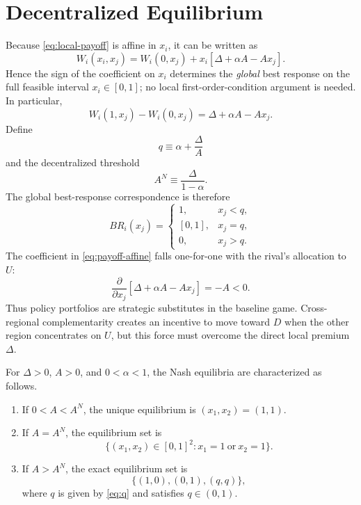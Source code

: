 \section{Decentralized Equilibrium}
\label{sec:equilibrium}

Because \eqref{eq:local-payoff} is affine in $x_i$, it can be written as
\begin{equation}
W_i(x_i,x_j)
=W_i(0,x_j)
+x_i\left[\Delta+\alpha A-Ax_j\right].
\label{eq:payoff-affine}
\end{equation}
Hence the sign of the coefficient on $x_i$ determines the \emph{global} best response on the full feasible interval $x_i\in[0,1]$; no local first-order-condition argument is needed. In particular,
\begin{equation}
W_i(1,x_j)-W_i(0,x_j)
=\Delta+\alpha A-Ax_j.
\label{eq:payoff-difference}
\end{equation}
Define
\begin{equation}
q\equiv \alpha+\frac{\Delta}{A}
\label{eq:q}
\end{equation}
and the decentralized threshold
\begin{equation}
A^N\equiv \frac{\Delta}{1-\alpha}.
\label{eq:AN}
\end{equation}
The global best-response correspondence is therefore
\begin{equation}
BR_i(x_j)=
\begin{cases}
1, & x_j<q,\\
[0,1], & x_j=q,\\
0, & x_j>q.
\end{cases}
\label{eq:best-response}
\end{equation}
The coefficient in \eqref{eq:payoff-affine} falls one-for-one with the rival's allocation to $U$:
\begin{equation}
\frac{\partial}{\partial x_j}
\left[\Delta+\alpha A-Ax_j\right]=-A<0.
\label{eq:strategic-substitutes}
\end{equation}
Thus policy portfolios are strategic substitutes in the baseline game. Cross-regional complementarity creates an incentive to move toward $D$ when the other region concentrates on $U$, but this force must overcome the direct local premium $\Delta$.

\begin{proposition}
\label{prop:nash-set}
For $\Delta>0$, $A>0$, and $0<\alpha<1$, the Nash equilibria are characterized as follows.
\begin{enumerate}
\item If $0<A<A^N$, the unique equilibrium is $(x_1,x_2)=(1,1)$.
\item If $A=A^N$, the equilibrium set is
\[
\{(x_1,x_2)\in[0,1]^2:x_1=1\ \text{or}\ x_2=1\}.
\]
\item If $A>A^N$, the exact equilibrium set is
\[
\{(1,0),(0,1),(q,q)\},
\]
where $q$ is given by \eqref{eq:q} and satisfies $q\in(0,1)$.
\end{enumerate}
\end{proposition}

